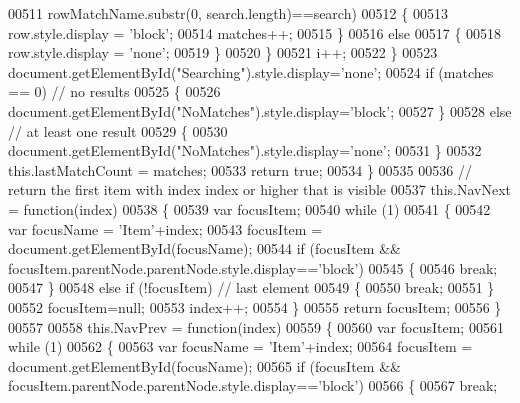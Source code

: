 \begin{DoxyCode}
00511              rowMatchName.substr(0, search.length)==search)
00512           \{
00513             row.style.display = \textcolor{stringliteral}{'block'};
00514             matches++;
00515           \}
00516           \textcolor{keywordflow}{else}
00517           \{
00518             row.style.display = \textcolor{stringliteral}{'none'};
00519           \}
00520         \}
00521         i++;
00522       \}
00523       document.getElementById(\textcolor{stringliteral}{"Searching"}).style.display=\textcolor{stringliteral}{'none'};
00524       \textcolor{keywordflow}{if} (matches == 0) \textcolor{comment}{// no results}
00525       \{
00526         document.getElementById(\textcolor{stringliteral}{"NoMatches"}).style.display=\textcolor{stringliteral}{'block'};
00527       \}
00528       \textcolor{keywordflow}{else} \textcolor{comment}{// at least one result}
00529       \{
00530         document.getElementById(\textcolor{stringliteral}{"NoMatches"}).style.display=\textcolor{stringliteral}{'none'};
00531       \}
00532       this.lastMatchCount = matches;
00533       \textcolor{keywordflow}{return} \textcolor{keyword}{true};
00534     \}
00535 
00536     \textcolor{comment}{// return the first item with index index or higher that is visible}
00537     this.NavNext = \textcolor{keyword}{function}(index)
00538     \{
00539       var focusItem;
00540       \textcolor{keywordflow}{while} (1)
00541       \{
00542         var focusName = \textcolor{stringliteral}{'Item'}+index;
00543         focusItem = document.getElementById(focusName);
00544         \textcolor{keywordflow}{if} (focusItem && focusItem.parentNode.parentNode.style.display==\textcolor{stringliteral}{'block'})
00545         \{
00546           \textcolor{keywordflow}{break};
00547         \}
00548         \textcolor{keywordflow}{else} \textcolor{keywordflow}{if} (!focusItem) \textcolor{comment}{// last element}
00549         \{
00550           \textcolor{keywordflow}{break};
00551         \}
00552         focusItem=null;
00553         index++;
00554       \}
00555       \textcolor{keywordflow}{return} focusItem;
00556     \}
00557 
00558     this.NavPrev = \textcolor{keyword}{function}(index)
00559     \{
00560       var focusItem;
00561       \textcolor{keywordflow}{while} (1)
00562       \{
00563         var focusName = \textcolor{stringliteral}{'Item'}+index;
00564         focusItem = document.getElementById(focusName);
00565         \textcolor{keywordflow}{if} (focusItem && focusItem.parentNode.parentNode.style.display==\textcolor{stringliteral}{'block'})
00566         \{
00567           \textcolor{keywordflow}{break};

\end{DoxyCode}
